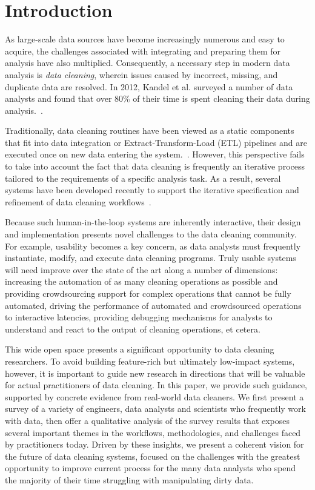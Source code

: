 \section{Introduction}
As large-scale data sources have become increasingly numerous and easy to acquire, the challenges associated with integrating and preparing them for analysis have also multiplied.
Consequently, a necessary step in modern data analysis is \textit{data cleaning}, wherein issues caused by incorrect, missing, and duplicate data are resolved.
In 2012, Kandel et al. surveyed a number of data analysts and found that over 80\% of their time is spent cleaning their data during analysis.~\cite{kandel2012}.

Traditionally, data cleaning routines have been viewed as a static components that fit into data integration or Extract-Transform-Load (ETL) pipelines and are executed once on new data entering the system.~\cite{apachefalcon, informatica, talend, nadeef}.
However, this perspective fails to take into account the fact that data cleaning is frequently an iterative process tailored to the requirements of a specific analysis task.
As a result, several systems have been developed recently to support the iterative specification and refinement of data cleaning workflows~\cite{trifacta, 2011-wrangler, openrefine, wisteria}.

Because such human-in-the-loop systems are inherently interactive, their design and implementation presents novel challenges to the data cleaning community.
For example, usability becomes a key concern, as data analysts must frequently instantiate, modify, and execute data cleaning programs.
Truly usable systems will need improve over the state of the art along a number of dimensions: increasing the automation of as many cleaning operations as possible and providing crowdsourcing support for complex operations that cannot be fully automated, driving the performance of automated and crowdsourced operations to interactive latencies, providing debugging mechanisms for analysts to understand and react to the output of cleaning operations, et cetera.

This wide open space presents a significant opportunity to data cleaning researchers.
{\color{red}{fighting words!}} To avoid building feature-rich but ultimately low-impact systems, however, it is important to guide new research in directions that will be valuable for actual practitioners of data cleaning.
In this paper, we provide such guidance, supported by concrete evidence from real-world data cleaners.
We first present a survey of a variety of engineers, data analysts and scientists who frequently work with data, then offer a qualitative analysis of the survey results that exposes several important themes in the workflows, methodologies, and challenges faced by practitioners today.
Driven by these insights, we present a coherent vision for the future of data cleaning systems, focused on the challenges with the greatest opportunity to improve current process for the many data analysts who spend the majority of their time struggling with manipulating dirty data.


